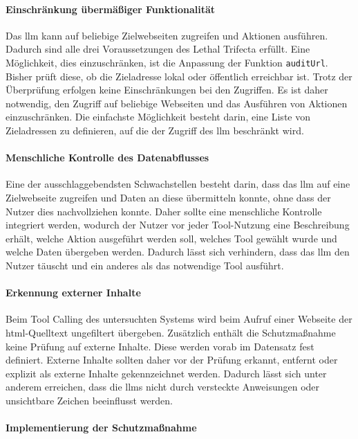 \paragraph{Einschränkung übermäßiger Funktionalität}

Das \ac{llm} kann auf beliebige Zielwebseiten zugreifen und Aktionen ausführen. Dadurch sind alle drei Voraussetzungen des Lethal Trifecta erfüllt. Eine
Möglichkeit, dies einzuschränken, ist die Anpassung der Funktion \texttt{auditUrl}. Bisher prüft diese, ob die Zieladresse lokal oder öffentlich
erreichbar ist. Trotz der Überprüfung erfolgen keine Einschränkungen bei den Zugriffen. Es ist daher notwendig,
den Zugriff auf beliebige Webseiten und das Ausführen von Aktionen einzuschränken. Die einfachste Möglichkeit besteht darin, eine Liste von Zieladressen zu definieren,
auf die der Zugriff des \ac{llm} beschränkt wird.

\paragraph{Menschliche Kontrolle des Datenabflusses}

Eine der ausschlaggebendsten Schwachstellen besteht darin, dass das \ac{llm} auf eine Zielwebseite zugreifen und Daten an diese übermitteln konnte, ohne dass der Nutzer dies
nachvollziehen konnte. Daher sollte eine menschliche Kontrolle integriert werden, wodurch der Nutzer vor jeder Tool-Nutzung eine Beschreibung erhält, welche
Aktion ausgeführt werden soll, welches Tool gewählt wurde und welche Daten übergeben werden. Dadurch lässt sich verhindern, dass das \ac{llm} den Nutzer täuscht
und ein anderes als das notwendige Tool ausführt.

\paragraph{Erkennung externer Inhalte}

Beim Tool Calling des untersuchten Systems wird beim Aufruf einer Webseite der \ac{html}-Quelltext ungefiltert übergeben. Zusätzlich enthält die Schutzmaßnahme
keine Prüfung auf externe Inhalte. Diese werden vorab im Datensatz fest definiert. Externe Inhalte sollten daher vor der Prüfung erkannt, entfernt oder explizit
als externe Inhalte gekennzeichnet werden. Dadurch lässt sich unter anderem erreichen, dass die \acp{llm} nicht durch versteckte Anweisungen oder unsichtbare Zeichen
beeinflusst werden.

\paragraph{Implementierung der Schutzmaßnahme}

